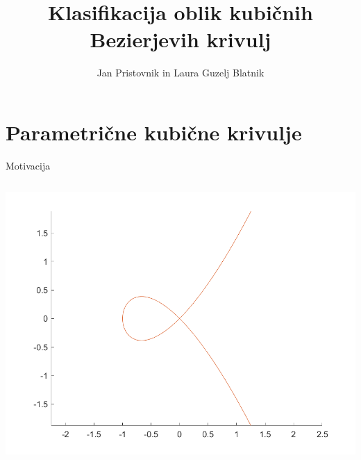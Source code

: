 \documentclass{beamer} %
\title{Klasifikacija oblik kubičnih Bezierjevih krivulj}
\author{Jan Pristovnik in Laura Guzelj Blatnik}
\institute{Fakulteta za matematiko in fiziko}
\date{\displaydate{date}}
\begin{document}
 
\frame{\titlepage} %
 
\section{Parametrične kubične krivulje} 

\begin{frame}{Motivacija}
	
    \begin{columns}[T]
	\begin{center}
	\includegraphics[width=0.6\columnwidth]{loop.png}


\end{center}
\end{columns}
\end{frame}
\end{document}
